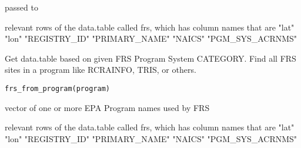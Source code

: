 \documentclass[a4paper]{book}
\begin{document}
%
\begin{Arguments}
\begin{ldescription}
\item[\code{naics\_code\_or\_name}] 

\item[\code{...}] passed to 
\end{ldescription}
\end{Arguments}
%
\begin{Value}
relevant rows of the data.table called frs, which has column names that are
"lat" "lon" "REGISTRY\_ID" "PRIMARY\_NAME" "NAICS" "PGM\_SYS\_ACRNMS"
\end{Value}
%
\begin{SeeAlso}\relax
{} 
\end{SeeAlso}
%
\begin{Examples}
\end{Examples}
%
\begin{Description}\relax
Get data.table based on given FRS Program System CATEGORY.
Find all FRS sites in a program like RCRAINFO, TRIS, or others.
\end{Description}
%
\begin{Usage}
\begin{verbatim}
frs_from_program(program)
\end{verbatim}
\end{Usage}
%
\begin{Arguments}
\begin{ldescription}
\item[\code{program}] vector of one or more EPA Program names used by FRS
\end{ldescription}
\end{Arguments}
%
\begin{Value}
relevant rows of the data.table called frs, which has column names that are
"lat" "lon" "REGISTRY\_ID" "PRIMARY\_NAME" "NAICS" "PGM\_SYS\_ACRNMS"
\end{Value}
\end{document}
